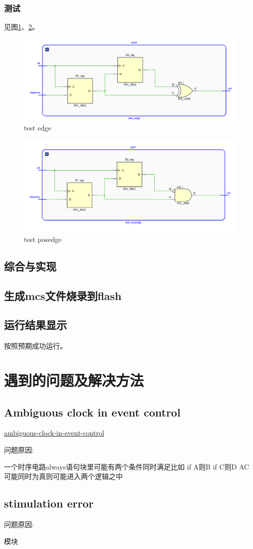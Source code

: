 \documentclass[UTF8]{article}
\begin{document}
\subsubsection{测试}

见图\ref{FIG.10}、\ref{FIG.11}。

\begin{figure}[H]
    \centering
    \includegraphics[scale=0.4]{test_edge.PNG}
    \caption{test edge}
    \label{FIG.10}
\end{figure}
\begin{figure}[H]
    \centering
    \includegraphics[scale=0.4]{test_posedge.PNG}
    \caption{test posedge}
    \label{FIG.11}
\end{figure}
\subsection{综合与实现}
\subsection{生成mcs文件烧录到flash}
\subsection{运行结果显示}
按照预期成功运行。

\section{遇到的问题及解决方法}
\subsection{Ambiguous clock in event control}

\href{https://stackoverflow.com/questions/27145548/ambiguous-clock-in-event-control}{ambiguous-clock-in-event-control} 

问题原因: 

一个时序电路always语句块里可能有两个条件同时满足比如
    if A则B
    if C则D
AC可能同时为真则可能进入两个逻辑之中

\subsection{stimulation error}
问题原因:

模块
\end{document}
